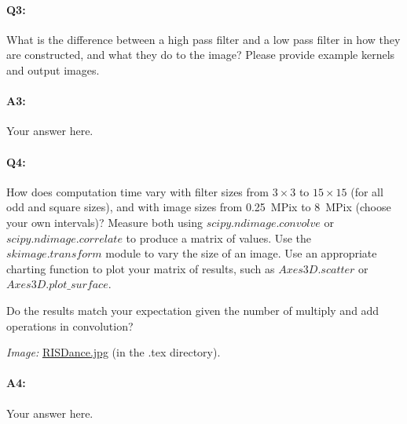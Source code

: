 
\pagebreak
\paragraph{Q3:} What is the difference between a high pass filter and a low pass filter in how they are constructed, and what they do to the image? Please provide example kernels and output images.

\paragraph{A3:} Your answer here.




\pagebreak
\paragraph{Q4:} How does computation time vary with filter sizes from $3\times3$ to $15\times15$ (for all odd and square sizes), and with image sizes from 0.25~MPix to 8~MPix (choose your own intervals)? Measure both using \href{https://docs.scipy.org/doc/scipy/reference/generated/scipy.ndimage.convolve.html}{$scipy.ndimage.convolve$} or \href{https://docs.scipy.org/doc/scipy/reference/generated/scipy.ndimage.correlate.html}{$scipy.ndimage.correlate$} to produce a matrix of values. Use the \href{http://scikit-image.org/docs/dev/auto_examples/transform/plot_rescale.html}{$skimage.transform$} module to vary the size of an image. Use an appropriate charting function to plot your matrix of results, such as \href{https://matplotlib.org/tutorials/toolkits/mplot3d.html#scatter-plots}{$Axes3D.scatter$} or \href{https://matplotlib.org/tutorials/toolkits/mplot3d.html#surface-plots}{$Axes3D.plot\textrm{\_}surface$}.

Do the results match your expectation given the number of multiply and add operations in convolution?

\emph{Image:} \href{RISDance.jpg}{RISDance.jpg} (in the .tex directory).

\paragraph{A4:} Your answer here.









